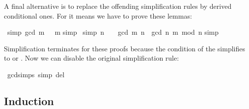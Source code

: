 \begin{isabellebody}
\begin{isamarkuptext}
A final alternative is to replace the offending simplification rules by
derived conditional ones. For  it means we have to prove
these lemmas:%
\end{isamarkuptext}%
\isamarkuptrue%
\isamarkupfalse%
\ {\isacharbrackleft}simp{\isacharbrackright}{\isacharcolon}\ {\isachardoublequoteopen}gcd\ m\ {}\ {\isacharequal}\ m{\isachardoublequoteclose}\isanewline
%
\isadelimproof
%
\endisadelimproof
%
\isatagproof
{}\isamarkupfalse%
{\isacharparenleft}simp{\isacharparenright}\isanewline
{}\isamarkupfalse%
%
\endisatagproof
{\isafoldproof}%
%
\isadelimproof
\isanewline
%
\endisadelimproof
\isanewline
{}\isamarkupfalse%
\ {\isacharbrackleft}simp{\isacharbrackright}{\isacharcolon}\ {\isachardoublequoteopen}n\ {\isasymnoteq}\ {}\ {\isasymLongrightarrow}\ gcd\ m\ n\ {\isacharequal}\ gcd\ n\ {\isacharparenleft}m\ mod\ n{\isacharparenright}{\isachardoublequoteclose}\isanewline
%
\isadelimproof
%
\endisadelimproof
%
\isatagproof
{}\isamarkupfalse%
{\isacharparenleft}simp{\isacharparenright}\isanewline
{}\isamarkupfalse%
%
\endisatagproof
{\isafoldproof}%
%
\isadelimproof
%
\endisadelimproof
%
\begin{isamarkuptext}%
\noindent
Simplification terminates for these proofs because the condition of the  simplifies to  or .
Now we can disable the original simplification rule:%
\end{isamarkuptext}%
\isamarkuptrue%
\isamarkupfalse%
\ gcd{\isachardot}simps\ {\isacharbrackleft}simp\ del{\isacharbrackright}%
\begin{isamarkuptext}%

\subsection{Induction}
\label{sec:fun-induction}


\end{isamarkuptext}
\end{isabellebody}
